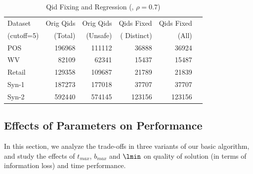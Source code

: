 
\begin{table}[th]
\caption{Qid Fixing and Regression (\PartialR, $\rho=0.7$)}
\centering
\begin{tabular}{|l|r|r|r|r|r|} \hline
Dataset 	& Orig Qids & Orig Qids &  Qids Fixed  & Qids Fixed   \\
(cutoff=5)	&(Total)  & (Unsafe) &( Distinct)  &(All)   \\ \hline \hline
POS  & 196968 & 111112 & 36888 & 36924\\ \hline
WV  & 82109	&62341	&15437	&15487\\ \hline
Retail  & 129358	&109687	&21789&	21839\\ \hline
Syn-1 & 187273&	177018&	37707&	37707\\ \hline
Syn-2  & 592440	&574145	&123156	&123156\\ \hline
\end{tabular}
\label{tab:regression}
\end{table}

\subsection{Effects of Parameters on Performance}\label{sec:eval:effect}
In this section, we analyze the trade-offs in three variants of our basic
algorithm, and study the effects of $t_{max}$, $b_{max}$ and $\lmin$ on
quality of solution (in terms of information loss) and time performance.

